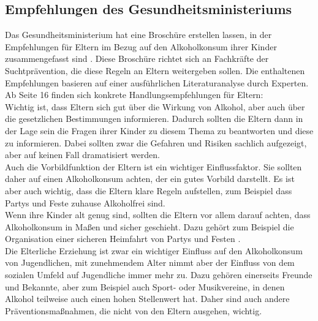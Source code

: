 \documentclass[12pt]{article}
\begin{document}
\subsection{Empfehlungen des Gesundheitsministeriums}
Das Gesundheitsministerium hat eine Broschüre erstellen lassen, in der Empfehlungen für Eltern im Bezug auf den Alkoholkonsum ihrer Kinder zusammengefasst sind \autocite{kuhn_empfehlungen_nodate}. Diese Broschüre richtet sich an Fachkräfte der Suchtprävention, die diese Regeln an Eltern weitergeben sollen. Die enthaltenen Empfehlungen basieren auf einer ausführlichen Literaturanalyse durch Experten. Ab Seite 16 finden sich konkrete Handlungsempfehlungen für Eltern:\\
Wichtig ist, dass Eltern sich gut über die Wirkung von Alkohol, aber auch über die gesetzlichen Bestimmungen informieren. Dadurch sollten die Eltern dann in der Lage sein die Fragen ihrer Kinder zu diesem Thema zu beantworten und diese zu informieren. Dabei sollten zwar die Gefahren und Risiken sachlich aufgezeigt, aber auf keinen Fall dramatisiert werden.\\
Auch die Vorbildfunktion der Eltern ist ein wichtiger Einflussfaktor. Sie sollten daher auf einen Alkoholkonsum achten, der ein gutes Vorbild darstellt. Es ist aber auch wichtig, dass die Eltern klare Regeln aufstellen, zum Beispiel dass Partys und Feste zuhause Alkoholfrei sind.\\
Wenn ihre Kinder alt genug sind, sollten die Eltern vor allem darauf achten, dass Alkoholkonsum in Maßen und sicher geschieht. Dazu gehört zum Beispiel die Organisation einer sicheren Heimfahrt von Partys und Festen \autocite[16-23]{kuhn_empfehlungen_nodate}.\\
Die Elterliche Erziehung ist zwar ein wichtiger Einfluss auf den Alkoholkonsum von Jugendlichen, mit zunehmendem Alter nimmt aber der Einfluss von dem sozialen Umfeld auf Jugendliche immer mehr zu. Dazu gehören einerseits Freunde und Bekannte, aber zum Beispiel auch Sport- oder Musikvereine, in denen Alkohol teilweise auch einen hohen Stellenwert hat. Daher sind auch andere Präventionsmaßnahmen, die nicht von den Eltern ausgehen, wichtig.
\end{document}
